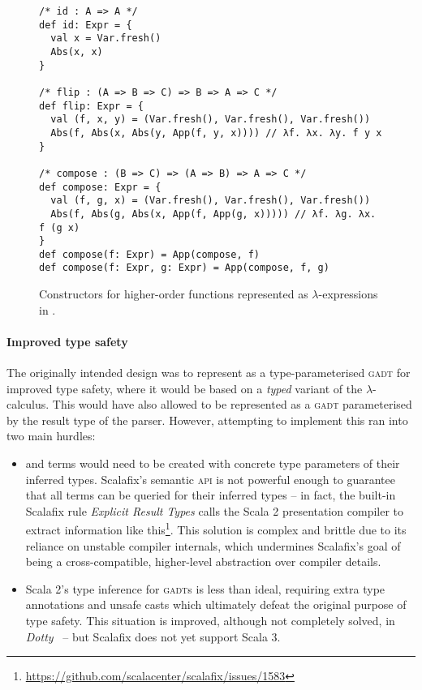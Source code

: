 \documentclass[../../../main.tex]{subfiles}
\begin{document}
\begin{figure}
\begin{verbatim}
/* id : A => A */
def id: Expr = {
  val x = Var.fresh()
  Abs(x, x)
}

/* flip : (A => B => C) => B => A => C */
def flip: Expr = {
  val (f, x, y) = (Var.fresh(), Var.fresh(), Var.fresh())
  Abs(f, Abs(x, Abs(y, App(f, y, x)))) // λf. λx. λy. f y x
}

/* compose : (B => C) => (A => B) => A => C */
def compose: Expr = {
  val (f, g, x) = (Var.fresh(), Var.fresh(), Var.fresh())
  Abs(f, Abs(g, Abs(x, App(f, App(g, x))))) // λf. λg. λx. f (g x)
}
def compose(f: Expr) = App(compose, f)
def compose(f: Expr, g: Expr) = App(compose, f, g)
\end{verbatim}
\caption{Constructors for higher-order functions represented as $\lambda$-expressions in .}
\label{fig:higher-order-funcs}
\end{figure}

\paragraph{Improved type safety}
The originally intended design was to represent  as a type-parameterised \textsc{gadt} for improved type safety, where it would be based on a \emph{typed} variant of the $\lambda$-calculus.
This would have also allowed  to be represented as a \textsc{gadt} parameterised by the result type of the parser.
However, attempting to implement this ran into two main hurdles:
\begin{itemize}
  \item {} and  terms would need to be created with concrete type parameters of their inferred types. Scalafix's semantic \textsc{api} is not powerful enough to guarantee that all terms can be queried for their inferred types -- in fact, the built-in Scalafix rule \emph{Explicit Result Types} calls the Scala 2 presentation compiler to extract information like this\footnote{\url{https://github.com/scalacenter/scalafix/issues/1583}}. This solution is complex and brittle due to its reliance on unstable compiler internals, which undermines Scalafix's goal of being a cross-compatible, higher-level abstraction over compiler details.
  \item Scala 2's type inference for \textsc{gadt}s is less than ideal, requiring extra type annotations and unsafe casts which ultimately defeat the original purpose of type safety. This situation is improved, although not completely solved, in \emph{Dotty}~\cite{parreaux_towards_2019} -- but Scalafix does not yet support Scala 3.
\end{itemize}
\end{document}
